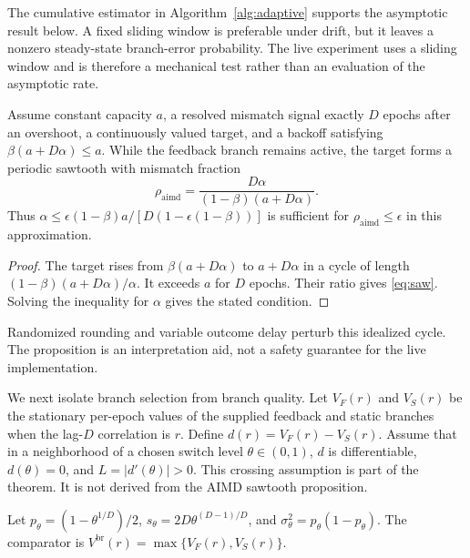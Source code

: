 The cumulative estimator in Algorithm~\ref{alg:adaptive} supports the asymptotic
result below. A fixed sliding window is preferable under drift, but it leaves a
nonzero steady-state branch-error probability. The live experiment uses a
sliding window and is therefore a mechanical test rather than an evaluation of
the asymptotic rate.

\begin{proposition}\label{prop:bound}
Assume constant capacity $a$, a resolved mismatch signal exactly $D$ epochs after
an overshoot, a continuously valued target, and a backoff satisfying
$\beta(a+D\alpha)\le a$. While the feedback branch remains active, the target
forms a periodic sawtooth with mismatch fraction
\begin{equation}\label{eq:saw}
\rho_{\mathrm{aimd}}
=\frac{D\alpha}{(1-\beta)(a+D\alpha)}.
\end{equation}
Thus $\alpha\le\epsilon(1-\beta)a/[D(1-\epsilon(1-\beta))]$ is sufficient for
$\rho_{\mathrm{aimd}}\le\epsilon$ in this approximation.
\end{proposition}
\begin{proof}
The target rises from $\beta(a+D\alpha)$ to $a+D\alpha$ in a cycle of length
$(1-\beta)(a+D\alpha)/\alpha$. It exceeds $a$ for $D$ epochs. Their ratio gives
\eqref{eq:saw}. Solving the inequality for $\alpha$ gives the stated condition.
\end{proof}
Randomized rounding and variable outcome delay perturb this idealized cycle. The
proposition is an interpretation aid, not a safety guarantee for the live
implementation.

We next isolate branch selection from branch quality. Let $V_F(r)$ and $V_S(r)$
be the stationary per-epoch values of the supplied feedback and static branches
when the lag-$D$ correlation is $r$. Define
$d(r)=V_F(r)-V_S(r)$. Assume that in a neighborhood of a chosen switch level
$\theta\in(0,1)$, $d$ is differentiable, $d(\theta)=0$, and
$L=|d'(\theta)|>0$. This crossing assumption is part of the theorem. It is not
derived from the AIMD sawtooth proposition.

Let $p_\theta=(1-\theta^{1/D})/2$,
$s_\theta=2D\theta^{(D-1)/D}$, and
$\sigma_\theta^2=p_\theta(1-p_\theta)$. The comparator is
$V^{\mathrm{br}}(r)=\max\{V_F(r),V_S(r)\}$.

